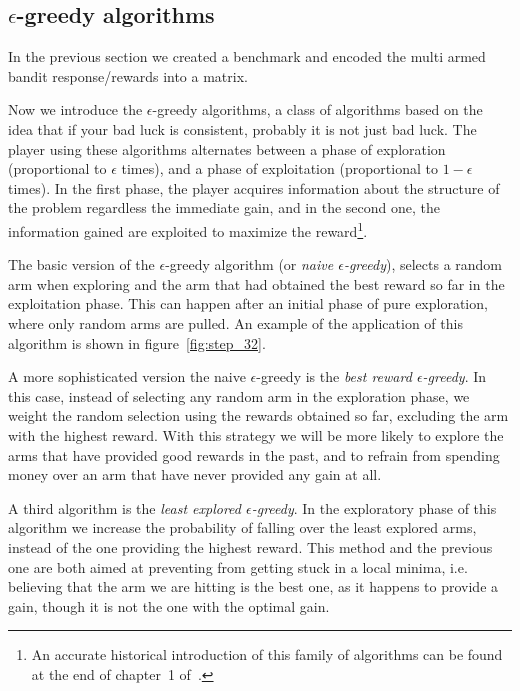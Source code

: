 \documentclass[]{scrartcl}
\theoremstyle{definition}
\begin{document}
\subsection*{$\epsilon$-greedy algorithms}

In the previous section we created a benchmark and encoded the multi armed bandit response/rewards into a matrix.

Now we introduce the $\epsilon$-greedy algorithms,
a class of algorithms based on the idea that if your bad luck is consistent, probably it is not just bad luck. The player using these algorithms alternates between a phase of exploration (proportional to $\epsilon$ times), and a phase of exploitation (proportional to $1 - \epsilon$ times). In the first phase, the player acquires information about the structure of the problem regardless the immediate gain, and in the second one, the information gained are exploited to maximize the reward\footnote{
    An accurate historical introduction of this family of algorithms can be found at the end of chapter~1 of~\cite{sutton2018reinforcement}.
}.

The basic version of the $\epsilon$-greedy algorithm (or \emph{naive $\epsilon$-greedy}), selects a random arm when exploring and the arm that had obtained the best reward so far in the exploitation phase. This can happen after an initial phase of pure exploration, where only random arms are pulled. An example of the application of this algorithm is shown in figure~\ref{fig:step_32}.

A more sophisticated version the naive $\epsilon$-greedy is the \emph{best reward $\epsilon$-greedy}. In this case, instead of selecting any random arm in the exploration phase, we weight the random selection using the rewards obtained so far, excluding the arm with the highest reward. With this strategy we will be more likely to explore the arms that have provided good rewards in the past, and to refrain from spending money over an arm that have never provided any gain at all.

A third algorithm is the \emph{least explored $\epsilon$-greedy}. In the exploratory phase of this algorithm we increase the probability of falling over the least explored arms, instead of the one providing the highest reward. This method and the previous one are both aimed at preventing from getting stuck in a local minima, i.e. believing that the arm we are hitting is the best one, as it happens to provide a gain, though it is not the one with the optimal gain.
\end{document}
